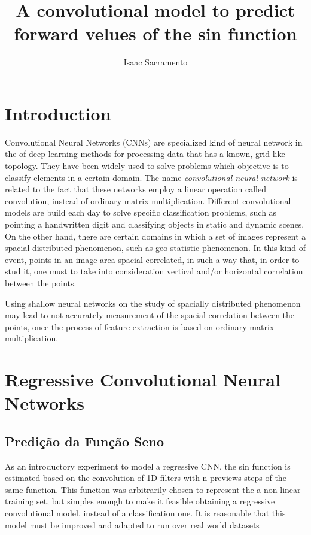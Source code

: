 \documentclass[a4paper,10pt]{report}
\title{A convolutional model to predict forward velues of the sin function}
\author{Isaac Sacramento}
\begin{document}
\maketitle

\begin{abstract}
\end{abstract}

\chapter{Introduction}

Convolutional Neural Networks (CNNs) are specialized kind of neural network in the
of deep learning methods for processing data that has a known,
grid-like topology. They have been widely used to solve problems
which objective is to classify elements in a certain domain.
The name \textit{convolutional neural network} is related to the
fact that these networks employ a linear operation called convolution,
instead of ordinary matrix multiplication.
Different convolutional models are build each day to solve specific
classification problems, such as pointing a handwritten digit and classifying objects
in static and dynamic scenes.
On the other hand, there are certain domains in which a set of
images represent a spacial distributed phenomenon, such as geo-statistic
phenomenon. In this kind of event, points in an image area spacial correlated,
in such a way that, in order to stud it, one must to take into consideration
vertical and/or horizontal correlation between the points.

Using shallow neural networks on the study of spacially distributed phenomenon
may lead to not accurately measurement of the spacial correlation between the
points, once the process of feature extraction is based on ordinary
matrix multiplication.

\chapter{Regressive Convolutional Neural Networks}

\section{Predição da Função Seno}
As an introductory experiment to model a regressive CNN, the sin function
is estimated based on the convolution of 1D filters with n previews steps
of the same function. This function was arbitrarily chosen to represent the
a non-linear training set, but simples enough to make it feasible obtaining
a regressive convolutional model, instead of a classification one.
It is reasonable that this model must be improved and adapted to run over
real world datasets
\end{document}
